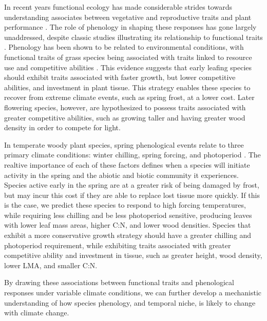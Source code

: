 \documentclass{article}\usepackage[]{graphicx}\usepackage[]{color}
\begin{document}
\par In recent years functional ecology has made considerable strides towards understanding associates between vegetative and reproductive traits and plant performance \cite{McGill2006}.  The role of phenology in shaping these responses has gone largely unaddressed, despite classic studies illustrating its relationship to functional traits \cite{Lechowich1984}. Phenology has been shown to be related to environmental conditions, with functional traits of grass species being associated with traits linked to resource use and competitive abilities \cite{Konig2018; SunFrelich2011}. This evidence suggests that early leafing species should exhibit traits associated with faster growth, but lower competitive abilities, and investment in plant tissue. This strategy enables these species to recover from extreme climate events, such as spring frost, at a lower cost. Later flowering species, however, are hypothesized to possess traits associated with greater competitive abilities, such as growing taller and having greater wood density in order to compete for light. 

\par In temperate woody plant species, spring phenological events relate to three primary climate conditions: winter chilling, spring forcing, and photoperiod \cite{Chuine2016}. The realtive importance of each of these factors defines when a species will initiate activity in the spring and the abiotic and biotic community it experiences. Species active early in the spring are at a greater risk of being damaged by frost, but may incur this cost if they are able to replace lost tissue more quickly. If this is the case, we predict these species to respond to high forcing temperatures, while requiring less chilling and be less photoperiod sensitive, producing leaves with lower leaf mass areas, higher C:N, and lower wood densities. Species that exhibit a more conservative growth strategy should have a greater chilling and photoperiod requirement, while exhibiting traits associated with greater competitive ability and investment in tissue, such as greater height, wood density, lower LMA, and smaller C:N.

By drawing these associations between functional traits and phenological responses under variable climate conditions, we can further develop a mechanistic understanding of how species phenology, and temporal niche, is likely to change with climate change. 
\end{document}
